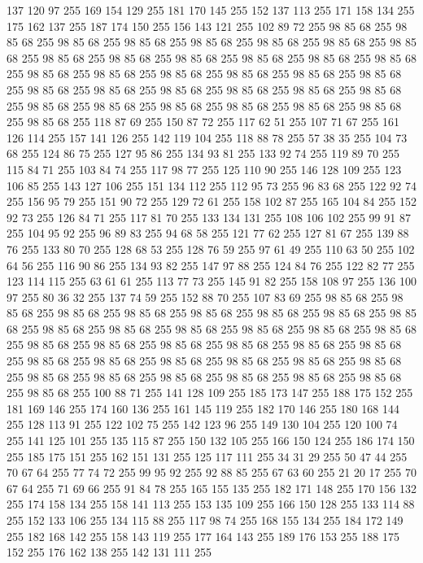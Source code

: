 137 120 97 255 169 154 129 255 181 170 145 255 152 137 113 255 171 158 134 255 175 162 137 255 187 174 150 255 156 143 121 255 102 89 72 255 98 85 68 255 98 85 68 255 98 85 68 255 98 85 68 255 98 85 68 255 98 85 68 255 98 85 68 255 98 85 68 255 98 85 68 255 98 85 68 255 98 85 68 255 98 85 68 255 98 85 68 255 98 85 68 255 98 85 68 255 98 85 68 255 98 85 68 255 98 85 68 255 98 85 68 255 98 85 68 255 98 85 68 255 98 85 68 255 98 85 68 255 98 85 68 255 98 85 68 255 98 85 68 255 98 85 68 255 98 85 68 255 98 85 68 255 98 85 68 255 98 85 68 255 98 85 68 255 98 85 68 255 118 87 69 255 150 87 72 255 117 62 51 255 107 71 67 255 161 126 114 255 157 141 126 255 142 119 104 255 118 88 78 255 57 38 35 255 104 73 68 255 124 86 75 255 127 95 86 255 134 93 81 255 133 92 74 255 119 89 70 255 115 84 71 255 103 84 74 255 117 98 77 255 125 110 90 255 146 128 109 255 123 106 85 255 143 127 106 255
151 134 112 255 112 95 73 255 96 83 68 255 122 92 74 255 156 95 79 255 151 90 72 255 129 72 61 255 158 102 87 255 165 104 84 255 152 92 73 255 126 84 71 255 117 81 70 255 133 134 131 255 108 106 102 255 99 91 87 255 104 95 92 255 96 89 83 255 94 68 58 255 121 77 62 255 127 81 67 255 139 88 76 255 133 80 70 255 128 68 53 255 128 76 59 255 97 61 49 255 110 63 50 255 102 64 56 255 116 90 86 255 134 93 82 255 147 97 88 255 124 84 76 255 122 82 77 255 123 114 115 255 63 61 61 255 113 77 73 255 145 91 82 255 158 108 97 255 136 100 97 255 80 36 32 255 137 74 59 255 152 88 70 255 107 83 69 255 98 85 68 255 98 85 68 255 98 85 68 255 98 85 68 255 98 85 68 255 98 85 68 255 98 85 68 255 98 85 68 255 98 85 68 255 98 85 68 255 98 85 68 255 98 85 68 255 98 85 68 255 98 85 68 255 98 85 68 255 98 85 68 255 98 85 68 255 98 85 68 255 98 85 68 255 98 85 68 255 98 85 68 255 98 85 68 255
98 85 68 255 98 85 68 255 98 85 68 255 98 85 68 255 98 85 68 255 98 85 68 255 98 85 68 255 98 85 68 255 98 85 68 255 98 85 68 255 98 85 68 255 100 88 71 255 141 128 109 255 185 173 147 255 188 175 152 255 181 169 146 255 174 160 136 255 161 145 119 255 182 170 146 255 180 168 144 255 128 113 91 255 122 102 75 255 142 123 96 255 149 130 104 255 120 100 74 255 141 125 101 255 135 115 87 255 150 132 105 255 166 150 124 255 186 174 150 255 185 175 151 255 162 151 131 255 125 117 111 255 34 31 29 255 50 47 44 255 70 67 64 255 77 74 72 255 99 95 92 255 92 88 85 255 67 63 60 255 21 20 17 255 70 67 64 255 71 69 66 255 91 84 78 255 165 155 135 255 182 171 148 255 170 156 132 255 174 158 134 255 158 141 113 255 153 135 109 255 166 150 128 255 133 114 88 255 152 133 106 255 134 115 88 255 117 98 74 255 168 155 134 255 184 172 149 255 182 168 142 255 158 143 119 255 177 164 143 255 189 176 153 255 188 175 152 255 176 162 138 255 142 131 111 255
